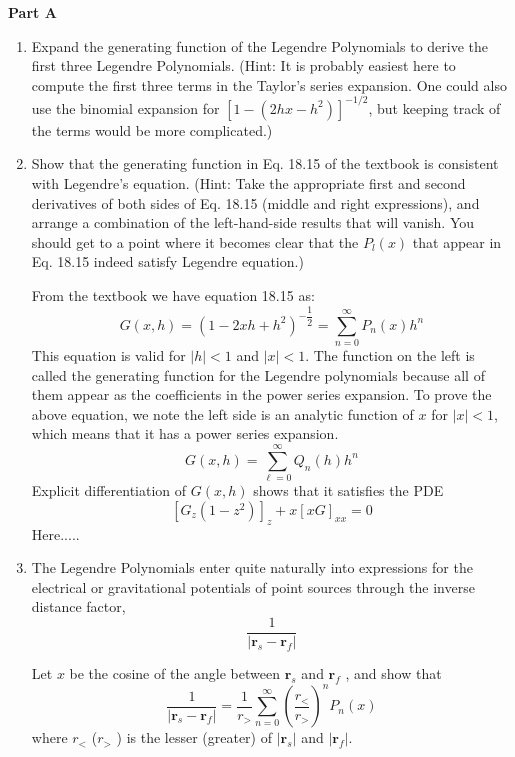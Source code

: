 \documentclass[fleqn]{article}
\begin{document}
  \textbf{Part A}
  \begin{enumerate}

    \item Expand the generating function of the Legendre Polynomials  to derive the first three Legendre Polynomials. 
    (Hint:  It is probably easiest here to compute the first three terms in the Taylor's series expansion. One could also use the binomial expansion for  $[1 -( 2hx - h^2 ) ]^{-1/2}$, but keeping track of the terms would be more complicated.)


    \item  Show that the generating function in Eq. 18.15 of the textbook is consistent with Legendre's equation.
    (Hint: Take the appropriate first and second derivatives of both sides of Eq. 18.15 (middle and right expressions), and arrange a combination of the left-hand-side results that will vanish.  You should get to a point where it becomes clear that the $P_l(x)$ that appear in Eq. 18.15 indeed satisfy Legendre equation.)

      \textcolor{hwColor}{
        From the textbook we have equation 18.15 as: 
        $$G(x,h)=\left(1-2xh+h^2\right)^{-\dfrac{1}{2}}=\sum\limits_{n=0}^{\infty} P_n(x) h^n$$
        This equation is valid for $|h|<1$ and $|x|<1$. The function on the left is called the generating function for the 
        Legendre polynomials because all of them appear as the coefficients in the power series expansion. To prove the
        above equation, we note the left side is an analytic function of $x$ for $|x|<1$, which means that it has a power series expansion.
        $$G(x,h)=\sum\limits_{\ell=0}^{\infty} Q_n(h) h^n$$
        Explicit differentiation of $G(x,h)$ shows that it satisfies the PDE 
        $$\left[G_z(1-z^2)\right]_z+x\left[xG\right]_{xx}=0$$
        Here.....
      }

    \item The Legendre Polynomials enter quite naturally into expressions for the electrical or gravitational potentials of
    point sources through the inverse distance factor,
    \begin{equation}
    \frac{1}{| {\mathbf r}_s -{\mathbf r}_f |}
    \end{equation}

    Let $x$ be the cosine of the angle between ${\mathbf r}_s$ and ${\mathbf r}_f$ , and show that
    \begin{equation}
    \frac{1}{| {\mathbf r}_s -{\mathbf r}_f |} = \frac{1}{r_{>}} \sum^{\infty}_{n=0} \left( \frac{r_{<}}{r_{>}}\right)^n P_n(x)
    \end{equation}
    where $r_{<}$ ($ r_{>}$ ) is the lesser (greater) of $|{\mathbf r}_s|$ and $|{\mathbf r}_f|$.


\end{enumerate}
\end{document}
